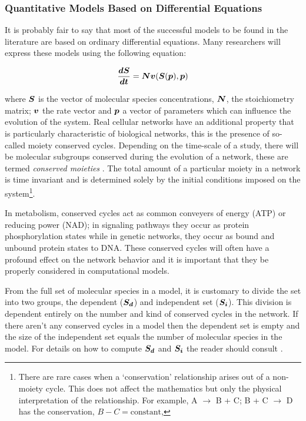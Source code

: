\documentclass[12pt]{article}
\newcommand{\bN}{\mbox{\boldmath $N$}}
\newcommand{\bSi}{\mbox{\boldmath $S_i$}}
\newcommand{\bSd}{\mbox{\boldmath $S_d$}}
\newcommand{\bS}{\mbox{\boldmath $S$}}
\newcommand{\bdS}{\mbox{\boldmath $dS$}}
\newcommand{\bdt}{\mbox{\boldmath $dt$}}
\newcommand{\bv}{\mbox{\boldmath $v$}}
\newcommand{\bp}{\mbox{\boldmath $p$}}
\begin{document}
\subsubsection{Quantitative Models Based on Differential Equations}

It is probably fair to say that most of the successful models to
be found in the literature are based on ordinary differential
equations. Many researchers will express these models using the
following equation:

\begin{equation}
\frac{\bdS}{\bdt} = \bN \bv (\bS (\bp), \bp) \label{eq:system}
\end{equation}

where $\bS$ is the vector of molecular species concentrations,
$\bN$, the stoichiometry matrix; $\bv$ the rate vector and $\bp$ a
vector of parameters which can influence the evolution of the
system. Real cellular networks have an additional property that is
particularly characteristic of biological networks, this is the
presence of so-called moiety conserved cycles. Depending on the
time-scale of a study, there will be molecular subgroups conserved
during the evolution of a network, these are termed {\em conserved
moieties} \cite{Re81}. The total amount of a particular moiety in
a network is time invariant and is determined solely by the
initial conditions imposed on the system\footnote {There are rare
cases when a `conservation' relationship arises out of a
non-moiety cycle. This does not affect the mathematics but only
the physical interpretation of the relationship. For example, A
$\rightarrow$ B + C; B + C $\rightarrow$ D has the conservation,
$B - C =\mbox{constant}$, }.

In metabolism, conserved cycles act as common conveyers of energy (ATP) or reducing power (NAD); in signaling pathways they occur as protein phosphorylation states while in genetic networks, they occur as bound and unbound protein states to DNA. These conserved cycles will often have a profound effect on the network behavior and it is important that they be properly considered in computational models.

From the full set of molecular species in a model, it is customary
to divide the set into two groups, the dependent ($\bSd$) and
independent set ($\bSi$). This division is dependent entirely on
the number and kind of conserved cycles in the network. If there aren't any conserved
cycles in a model then the dependent set is empty and the size of
the independent set equals the number of molecular species in the
model. For details on how to compute $\bSd$ and $\bSi$ the reader
should consult \cite{Sauro:ICycles2004}.
\end{document}
